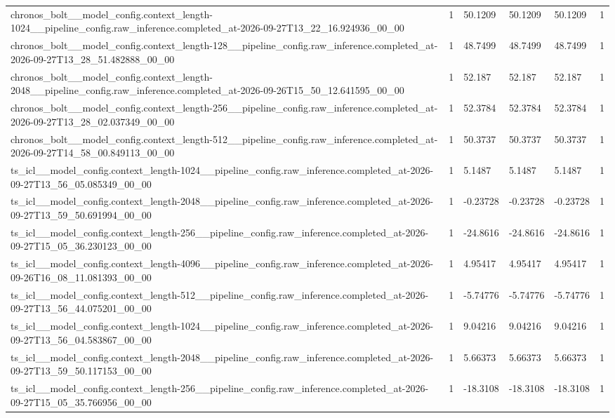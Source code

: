 \begin{tabular}{llllll}
chronos\_bolt\_\_model\_config.context\_length-1024\_\_pipeline\_config.raw\_inference.completed\_at-2026-09-27T13\_22\_16.924936\_00\_00 & 1 & 50.1209 & 50.1209 & 50.1209 & 1 \\
chronos\_bolt\_\_model\_config.context\_length-128\_\_pipeline\_config.raw\_inference.completed\_at-2026-09-27T13\_28\_51.482888\_00\_00 & 1 & 48.7499 & 48.7499 & 48.7499 & 1 \\
chronos\_bolt\_\_model\_config.context\_length-2048\_\_pipeline\_config.raw\_inference.completed\_at-2026-09-26T15\_50\_12.641595\_00\_00 & 1 & 52.187 & 52.187 & 52.187 & 1 \\
chronos\_bolt\_\_model\_config.context\_length-256\_\_pipeline\_config.raw\_inference.completed\_at-2026-09-27T13\_28\_02.037349\_00\_00 & 1 & 52.3784 & 52.3784 & 52.3784 & 1 \\
chronos\_bolt\_\_model\_config.context\_length-512\_\_pipeline\_config.raw\_inference.completed\_at-2026-09-27T14\_58\_00.849113\_00\_00 & 1 & 50.3737 & 50.3737 & 50.3737 & 1 \\
ts\_icl\_\_model\_config.context\_length-1024\_\_pipeline\_config.raw\_inference.completed\_at-2026-09-27T13\_56\_05.085349\_00\_00 & 1 & 5.1487 & 5.1487 & 5.1487 & 1 \\
ts\_icl\_\_model\_config.context\_length-2048\_\_pipeline\_config.raw\_inference.completed\_at-2026-09-27T13\_59\_50.691994\_00\_00 & 1 & -0.23728 & -0.23728 & -0.23728 & 1 \\
ts\_icl\_\_model\_config.context\_length-256\_\_pipeline\_config.raw\_inference.completed\_at-2026-09-27T15\_05\_36.230123\_00\_00 & 1 & -24.8616 & -24.8616 & -24.8616 & 1 \\
ts\_icl\_\_model\_config.context\_length-4096\_\_pipeline\_config.raw\_inference.completed\_at-2026-09-26T16\_08\_11.081393\_00\_00 & 1 & 4.95417 & 4.95417 & 4.95417 & 1 \\
ts\_icl\_\_model\_config.context\_length-512\_\_pipeline\_config.raw\_inference.completed\_at-2026-09-27T13\_56\_44.075201\_00\_00 & 1 & -5.74776 & -5.74776 & -5.74776 & 1 \\
ts\_icl\_\_model\_config.context\_length-1024\_\_pipeline\_config.raw\_inference.completed\_at-2026-09-27T13\_56\_04.583867\_00\_00 & 1 & 9.04216 & 9.04216 & 9.04216 & 1 \\
ts\_icl\_\_model\_config.context\_length-2048\_\_pipeline\_config.raw\_inference.completed\_at-2026-09-27T13\_59\_50.117153\_00\_00 & 1 & 5.66373 & 5.66373 & 5.66373 & 1 \\
ts\_icl\_\_model\_config.context\_length-256\_\_pipeline\_config.raw\_inference.completed\_at-2026-09-27T15\_05\_35.766956\_00\_00 & 1 & -18.3108 & -18.3108 & -18.3108 & 1 \\

\end{tabular}
